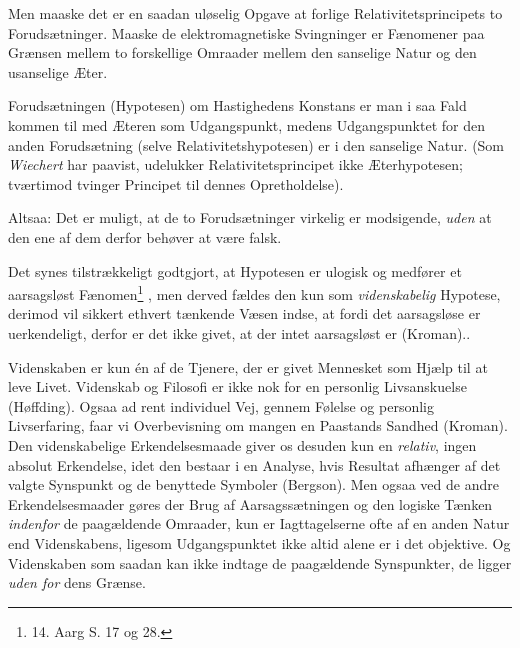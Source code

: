 \documentclass[12pt,a4paper]{article}
\newcommand{\opage}[1]{\marginnote{\footnotesize\textit{[#1]}}}
\begin{document}
Men maaske det er en saadan uløselig Opgave at forlige
Relativitetsprincipets to Forudsætninger. Maaske de elektromagnetiske
Svingninger er Fænomener paa Grænsen mellem to forskellige Omraader
mellem den sanselige Natur og den usanselige Æter.

Forudsætningen (Hypotesen) om Hastighedens Konstans er man i saa Fald
kommen til med Æteren som Udgangspunkt, medens Udgangspunktet for den
anden Forudsætning (selve Relativitetshypotesen) er i den sanselige
Natur. (Som \emph{Wiechert} har paavist, udelukker Relativitetsprincipet
ikke Æterhypotesen; tværtimod tvinger Principet til dennes
Opretholdelse).

Altsaa: Det er muligt, at de to Forudsætninger virkelig er modsigende,
\emph{uden} at den ene af dem derfor behøver at være falsk.

\bigskip

Det synes tilstrækkeligt godtgjort, at Hypotesen er ulogisk og medfører
et \guillemotleft aarsagsløst Fænomen\guillemotright\footnote{14. Aarg
S. 17 og 28.}%
, men derved fældes den kun som \emph{videnskabelig} Hypotese,
\guillemotleft derimod vil sikkert ethvert
\opage{16} \guillemotleft tænkende Væsen\guillemotright{} indse, at fordi det
aarsagsløse er uerkendeligt, derfor er det ikke givet, at der intet
aarsagsløst er\guillemotright{} (Kroman)..%

Videnskaben er kun én af de Tjenere, der er givet Mennesket som Hjælp til
at leve Livet. \guillemotleft Videnskab og Filosofi er ikke nok for en
personlig Livsanskuelse\guillemotright{} (Høffding). \guillemotleft Ogsaa
ad rent individuel Vej, gennem Følelse og personlig Livserfaring, faar vi
Overbevisning om mangen en Paastands Sandhed\guillemotright{} (Kroman).
Den videnskabelige Erkendelsesmaade giver os desuden kun en
\emph{relativ}, ingen absolut Erkendelse, idet den bestaar i en Analyse,
hvis Resultat afhænger af det valgte Synspunkt og de benyttede Symboler
(Bergson). Men ogsaa ved de andre Erkendelsesmaader gøres der Brug af
Aarsagssætningen og den logiske Tænken \emph{indenfor} de paagældende
Omraader, kun er Iagttagelserne ofte af en anden Natur end Videnskabens,
ligesom Udgangspunktet ikke altid alene er i det objektive. Og
Videnskaben som saadan kan ikke indtage de paagældende Synspunkter, de
ligger \emph{uden for} dens Grænse.
\end{document}
